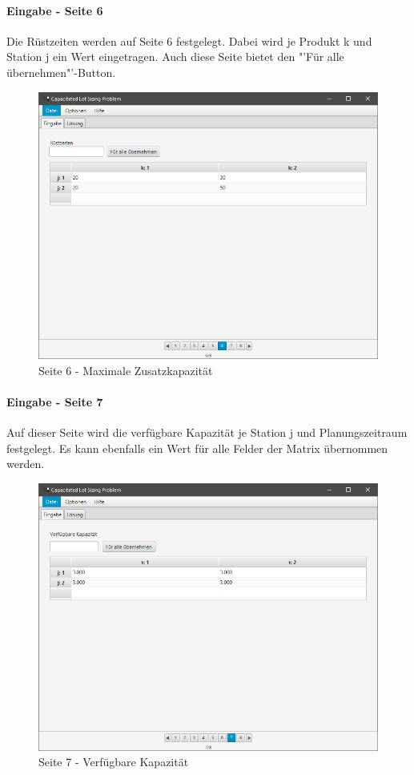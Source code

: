 \documentclass[12pt,a4paper, listof=entryprefix, bibliography=totocnumbered,toc=listofnumbered,lof=listofnumbered]{scrartcl}
\begin{document}
\paragraph{Eingabe - Seite 6}
Die Rüstzeiten werden auf Seite 6 festgelegt. Dabei wird je Produkt k und Station j ein Wert eingetragen. Auch diese Seite bietet den "'Für alle übernehmen"'-Button.

\begin{figure}[H]
	\centering
	\includegraphics[width=.8\linewidth]{images/seite6.png} 
	\caption{Seite 6 - Maximale Zusatzkapazität}
	\label{fig:seite6}
\end{figure}

\paragraph{Eingabe - Seite 7}
Auf dieser Seite wird die verfügbare Kapazität je Station j und Planungszeitraum festgelegt. Es kann ebenfalls ein Wert für alle Felder der Matrix übernommen werden.

\begin{figure}[H]
	\centering
	\includegraphics[width=.8\linewidth]{images/seite7.png} 
	\caption{Seite 7 - Verfügbare Kapazität}
	\label{fig:seite7}
\end{figure}
\end{document}
